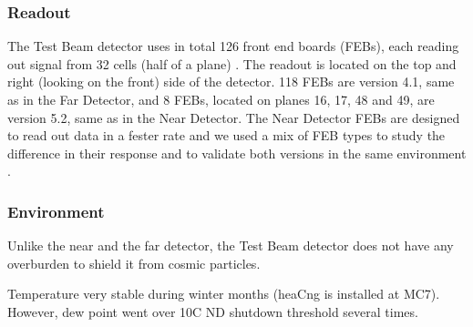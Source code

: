 \documentclass[12pt,a4paper]{article}
\begin{document}
\subsubsection*{Readout}
The Test Beam detector uses in total 126 front end boards (FEBs), each reading out signal from 32 cells (half of a plane) \cite{NOVA-doc-29543}. The readout is located on the top and right (looking on the front) side of the detector. 118 FEBs are version 4.1, same as in the Far Detector, and 8 FEBs, located on planes 16, 17, 48 and 49, are version 5.2, same as in the Near Detector. The Near Detector FEBs are designed to read out data in a fester rate and we used a mix of FEB types to study the difference in their response and to validate both versions in the same environment \cite{TeresaThesis}.


\subsubsection*{Environment}
Unlike the near and the far detector, the Test Beam detector does not have any overburden to shield it from cosmic particles. 


Temperature very stable during winter months (heaCng is installed at MC7). However, dew point went over 10C ND shutdown threshold several times.


\end{document}
